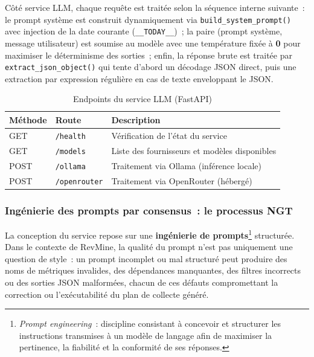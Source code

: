 Côté service LLM, chaque requête est traitée selon la séquence interne suivante~: le prompt
système est construit dynamiquement via \texttt{build\_system\_prompt()} avec injection de la
date courante (\texttt{\_\_TODAY\_\_})~; la paire (prompt système, message utilisateur) est
soumise au modèle avec une température fixée à \textbf{0} pour maximiser le déterminisme des
sorties~; enfin, la réponse brute est traitée par \texttt{extract\_json\_object()} qui tente
d'abord un décodage JSON direct, puis une extraction par expression régulière en cas de texte
enveloppant le JSON.

\begin{table}[H]
\centering
\small
\caption{Endpoints du service LLM (FastAPI)}
\label{tab:endpoints-llm}
\begin{tabular}{|>{\centering\arraybackslash}p{1.5cm}
                |>{\raggedright\arraybackslash}p{4.5cm}
                |>{\raggedright\arraybackslash}p{6.5cm}|}
\hline
\textbf{Méthode} & \textbf{Route} & \textbf{Description} \\
\hline
GET & \texttt{/health} & Vérification de l'état du service \\
\hline
GET & \texttt{/models} & Liste des fournisseurs et modèles disponibles \\
\hline
POST & \texttt{/ollama} & Traitement via Ollama (inférence locale) \\
\hline
POST & \texttt{/openrouter} & Traitement via OpenRouter (hébergé) \\
\hline
\end{tabular}
\end{table}

\subsubsection*{Ingénierie des prompts par consensus~: le processus NGT}
\label{subsubsec:ngt}

La conception du service repose sur une \textbf{ingénierie de prompts}\footnote{\textit{Prompt
engineering}~: discipline consistant à concevoir et structurer les instructions transmises à un
modèle de langage afin de maximiser la pertinence, la fiabilité et la conformité de ses réponses.}
structurée. Dans le contexte de RevMine, la qualité du prompt n'est pas uniquement une question
de style~: un prompt incomplet ou mal structuré peut produire des noms de métriques invalides,
des dépendances manquantes, des filtres incorrects ou des sorties JSON malformées, chacun de ces
défauts compromettant la correction ou l'exécutabilité du plan de collecte généré.

